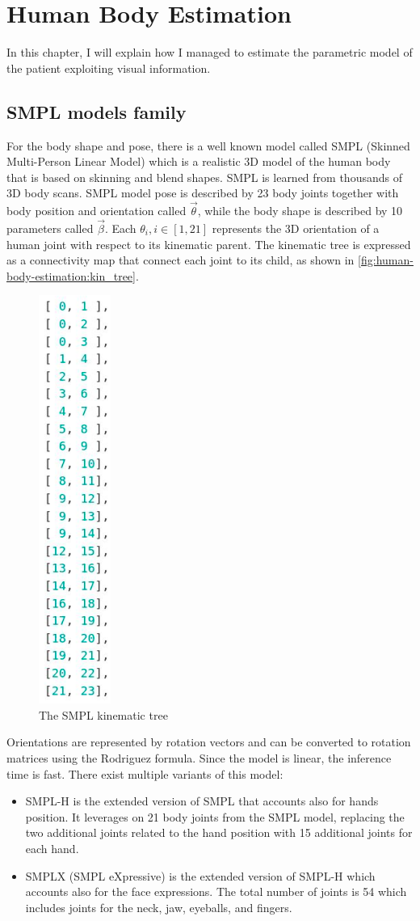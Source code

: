 \chapter{Human Body Estimation}
In this chapter, I will explain how I managed to estimate the parametric model of the patient exploiting visual information.

\section{SMPL models family}
For the body shape and pose, there is a well known model called SMPL (Skinned Multi-Person Linear Model) \cite{SMPL:2015} which is a realistic 3D model of the human body that is based on skinning and blend shapes. SMPL is learned from thousands of 3D body scans. SMPL model pose is described by 23 body joints together with body position and orientation called $\vec{\theta}$, while the body shape is described by 10 parameters called $\vec{\beta}$. Each $\theta_i, i \in [1,21] $ represents the 3D orientation of a human joint with respect to its kinematic parent. The kinematic tree is expressed as a connectivity map that connect each joint to its child, as shown in \autoref{fig:human-body-estimation:kin_tree}.
\begin{figure}[h]
    \centering
    \includegraphics[width=0.07\linewidth]{images/kinematic_tree.png}
    \caption{The SMPL kinematic tree}
    \label{fig:human-body-estimation:kin_tree}
\end{figure}
Orientations are represented by rotation vectors and can be converted to rotation matrices using the Rodriguez formula. %
Since the model is linear, the inference time is fast.
There exist multiple variants of this model:
\begin{itemize}
    \item SMPL-H\cite{MANO:SIGGRAPHASIA:2017} is the extended version of SMPL that accounts also for hands position. It leverages on 21 body joints from the SMPL model, replacing the two additional joints related to the hand position with 15 additional joints for each hand.
    \item SMPLX\cite{SMPL-X:2019} (SMPL eXpressive) is the extended version of SMPL-H which accounts also for the face expressions. The total number of joints is 54 which includes joints for the neck, jaw, eyeballs, and fingers. 
\end{itemize}
